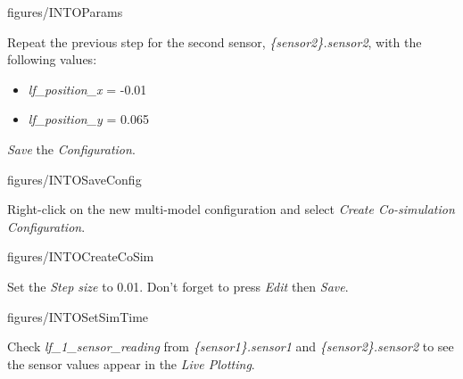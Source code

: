 \documentclass[11pt,a4paper]{../tutorial}
\begin{document}
\begin{instructions}
    \begin{annotation}[width=0.8\linewidth]{figures/INTOParams}
    \end{annotation}

\item Repeat the previous step for the second sensor, \emph{\{sensor2\}.sensor2}, with the following values:

    \begin{itemize}
        \item \emph{lf\_position\_x} = -0.01
        \item \emph{lf\_position\_y} = 0.065
    \end{itemize}

\item \emph{Save} the \emph{Configuration}.

    \begin{annotation}[width=0.85\linewidth,trim=0 0 0 250,clip]{figures/INTOSaveConfig}
    \end{annotation}

\item Right-click on the new multi-model configuration and select \emph{Create Co-simulation Configuration}.

    \begin{annotation}[width=0.85\linewidth,trim=0 120 0 130,clip]{figures/INTOCreateCoSim}
    \end{annotation}

\item Set the \emph{Step size} to 0.01. Don't forget to press \emph{Edit} then \emph{Save}.

    \begin{annotation}[width=0.85\linewidth,trim=0 0 0 0,clip]{figures/INTOSetSimTime}
    \end{annotation}

\item Check \emph{lf\_1\_sensor\_reading} from \emph{\{sensor1\}.sensor1} and \emph{\{sensor2\}.sensor2} to see the sensor values appear in the \emph{Live Plotting}.


\end{instructions}
\end{document}

